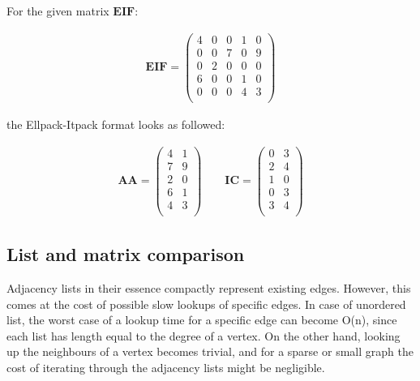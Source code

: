 \documentclass[thesis=M,english]{FITthesis}[2012/10/20]
\begin{document}
For the given matrix $\textbf{EIF}$:

$$
\begin{array}{c}
\textbf{EIF} = 
\begin{pmatrix}
4 & 0 & 0 & 1 & 0 \\
0 & 0 & 7 & 0 & 9 \\
0 & 2 & 0 & 0 & 0 \\
6 & 0 & 0 & 1 & 0 \\
0 & 0 & 0 & 4 & 3\\
\end{pmatrix}
\end{array}
$$

the Ellpack-Itpack format looks as followed:
 
$$
\begin{array}{lr}
\textbf{AA} = 
\begin{pmatrix}
4 & 1 \\
7 & 9 \\
2 & 0 \\
6 & 1 \\
4 & 3 \\
\end{pmatrix}
\quad \quad
\textbf{IC} = 
\begin{pmatrix}
0 & 3  \\
2 & 4 \\
1 & 0 \\
0 & 3\\
3 & 4 \\
\end{pmatrix}
\end{array}
$$

\subsection{List and matrix comparison}

Adjacency lists in their essence compactly represent existing edges. 
However, this comes at the cost of possible slow lookups of specific edges.
In case of unordered list, the worst case of a lookup time for a specific edge can become O(n), since each list has length equal to the degree of a vertex.
On the other hand, looking up the neighbours of a vertex becomes trivial, and for a sparse or small graph the cost of iterating through the adjacency lists might be negligible.
\end{document}
